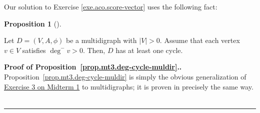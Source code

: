 \documentclass[numbers=enddot,12pt,final,onecolumn,notitlepage]{scrartcl}%
\theoremstyle{definition}
\newtheorem{prop}[theo]{Proposition}
\newenvironment{proposition}[1][]
{\begin{prop}[#1]\begin{leftbar}}
{\end{leftbar}\end{prop}}
\newenvironment{proof}[1][Proof]{\noindent\textbf{#1.} }{\ \rule{0.5em}{0.5em}}
\newcommand{\abs}[1]{\left| #1 \right|}
\newcommand{\tup}[1]{\left( #1 \right)}
\begin{document}
Our solution to Exercise \ref{exe.aco.score-vector} uses the
following fact:

\begin{proposition} \label{prop.mt3.deg-cycle-muldir}
Let $D = \tup{V, A, \phi}$ be a multidigraph with $\abs{V} > 0$.
Assume that each vertex $v \in V$ satisfies $\deg^- v > 0$. 
Then, $D$ has at least one cycle.
\end{proposition}

\begin{proof}[Proof of Proposition~\ref{prop.mt3.deg-cycle-muldir}.]
Proposition~\ref{prop.mt3.deg-cycle-muldir} is simply the
obvious generalization of
\href{http://www-users.math.umn.edu/~dgrinber/5707s17/mt1s.pdf}{Exercise 3 on
Midterm 1} to multidigraphs;
it is proven in precisely the same way.
\end{proof}
\end{document}
